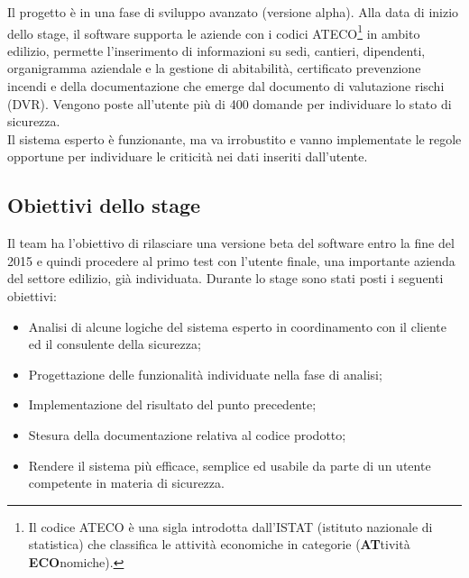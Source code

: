 Il progetto è in una fase di sviluppo avanzato (versione alpha).
Alla data di inizio dello stage, il software supporta le aziende con i codici ATECO\footnote{Il codice ATECO è una sigla introdotta dall'ISTAT (istituto nazionale di statistica) che classifica le attività economiche in categorie (\textbf{AT}tività \textbf{ECO}nomiche).} in ambito edilizio, permette l’inserimento di informazioni su sedi, cantieri, dipendenti, organigramma aziendale e la gestione di abitabilità, certificato prevenzione incendi e della documentazione che emerge dal documento di valutazione rischi (DVR).
Vengono poste all’utente più di 400 domande per individuare lo stato di sicurezza. \\ 
Il sistema esperto è funzionante, ma va irrobustito e vanno implementate le regole opportune per individuare le criticità nei dati inseriti dall’utente.


\subsection{Obiettivi dello stage}

Il team ha l’obiettivo di rilasciare una versione beta del software entro la fine del 2015 e quindi procedere al primo test con l’utente finale, una importante azienda del settore edilizio, già  individuata.
Durante lo stage sono stati posti i seguenti obiettivi:
\begin{itemize}
\item Analisi di alcune logiche del sistema esperto in coordinamento con il cliente ed il consulente della sicurezza;
\item Progettazione delle funzionalità individuate nella fase di analisi;
\item Implementazione del risultato del punto precedente;
\item Stesura della documentazione relativa al codice prodotto;
\item Rendere il sistema più efficace, semplice ed usabile da parte di un utente competente in materia di sicurezza.
\end{itemize}
